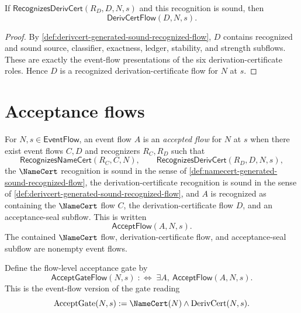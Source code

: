 \begin{theorem}
\label{thm:derivcert-generated-sound-establishes-flow}
If $\mathsf{RecognizesDerivCert}(R_D,D,N,s)$ and this recognition is sound, then
$$
  \mathsf{DerivCertFlow}(D,N,s).
$$
\end{theorem}

\begin{proof}
By \autoref{def:derivcert-generated-sound-recognized-flow}, $D$ contains recognized and sound source, classifier, exactness, ledger, stability, and strength subflows. These are exactly the event-flow presentations of the six derivation-certificate roles. Hence $D$ is a recognized derivation-certificate flow for $N$ at $s$.
\end{proof}

\section{Acceptance flows}
\label{sec:derivcert-generated-acceptance-flows}

\begin{definition}
\label{def:derivcert-generated-accepted-flow}
For $N,s \in \mathsf{EventFlow}$, an event flow $A$ is an \emph{accepted flow} for $N$ at $s$ when there exist event flows $C,D$ and recognizers $R_C,R_D$ such that
$$
  \mathsf{RecognizesNameCert}(R_C,C,N),
  \qquad
  \mathsf{RecognizesDerivCert}(R_D,D,N,s),
$$
the $\NameCert$ recognition is sound in the sense of \autoref{def:namecert-generated-sound-recognized-flow}, the derivation-certificate recognition is sound in the sense of \autoref{def:derivcert-generated-sound-recognized-flow}, and $A$ is recognized as containing the $\NameCert$ flow $C$, the derivation-certificate flow $D$, and an acceptance-seal subflow. This is written
$$
  \mathsf{AcceptFlow}(A,N,s).
$$
The contained $\NameCert$ flow, derivation-certificate flow, and acceptance-seal subflow are nonempty event flows.
\end{definition}

\begin{definition}
\label{def:derivcert-generated-accept-gate-flow}
Define the flow-level acceptance gate by
$$
  \mathsf{AcceptGateFlow}(N,s)
  \;:\Longleftrightarrow\;
  \exists A,\ \mathsf{AcceptFlow}(A,N,s).
$$
This is the event-flow version of the gate reading
$$
  \mathrm{AcceptGate}(N,s)
  :=
  \NameCert(N)
  \wedge
  \mathrm{DerivCert}(N,s).
$$
\end{definition}

